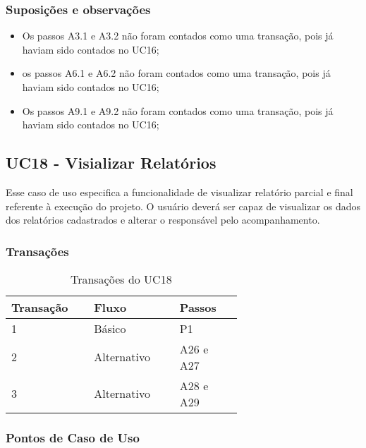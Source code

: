  \subsubsection{Suposições e observações}
  
  \begin{itemize}
   \item Os passos A3.1 e A3.2 não foram contados como uma transação, pois já haviam sido contados no UC16;	
   \item os passos A6.1 e A6.2 não foram contados como uma transação, pois já haviam sido contados no UC16;	
   \item Os passos A9.1 e A9.2 não foram contados como uma transação, pois já haviam sido contados no UC16;
  \end{itemize}
  
  \vfill
  
  
  
  \pagebreak
\subsection{UC18 - Visializar Relatórios}
  
  Esse caso de uso especifica a funcionalidade de visualizar relatório parcial e final referente à execução do projeto.
  O usuário deverá ser capaz de visualizar os dados dos relatórios cadastrados e alterar o responsável pelo acompanhamento.

  \subsubsection{Transações}

  \begin{table*}[!h]
  \centering
  \caption{Transações do UC18}
  \label{uc17_transactions}
    \begin{tabular}{|p{0.20\linewidth}|p{0.25\linewidth}|p{0.20\linewidth}|}
    \hline
    \textbf{Transação} & \textbf{Fluxo} & \textbf{Passos} \\ 
    \hline
    1 & Básico & P1\\
    \hline
    2 & Alternativo & A26 e A27\\
    \hline
    3 & Alternativo & A28 e A29\\
    \hline
    \end{tabular}
  \end{table*}

  \subsubsection{Pontos de Caso de Uso}

